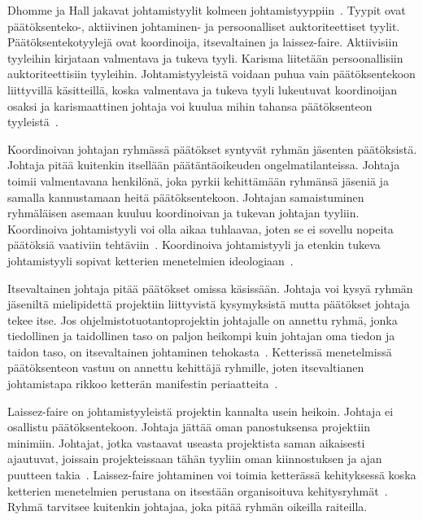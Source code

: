 \documentclass[finnish]{tktltiki2}
\theoremstyle{definition}
\theoremstyle{remark}
\begin{document}
 Dhomme ja Hall jakavat johtamistyylit kolmeen johtamistyyppiin~\cite{Dhomne:2012:ITL:2382887.2382899}. Tyypit ovat päätöksenteko-, aktiivinen johtaminen- ja persoonalliset auktoriteettiset tyylit. Päätöksentekotyylejä ovat koordinoija, itsevaltainen ja laissez-faire. Aktiivisiin tyyleihin kirjataan valmentava ja tukeva tyyli. Karisma liitetään persoonallisiin auktoriteettisiin tyyleihin. Johtamistyyleistä voidaan puhua vain päätöksentekoon liittyvillä käsitteillä, koska valmentava ja tukeva tyyli lukeutuvat koordinoijan osaksi ja karismaattinen johtaja voi kuulua mihin tahansa päätöksenteon tyyleistä~\cite{Dhomne:2012:ITL:2382887.2382899}.

Koordinoivan johtajan ryhmässä päätökset syntyvät ryhmän jäsenten päätöksistä. Johtaja pitää kuitenkin itsellään päätäntäoikeuden ongelmatilanteissa. Johtaja toimii valmentavana henkilönä, joka pyrkii kehittämään ryhmänsä jäseniä ja samalla kannustamaan heitä päätöksentekoon. Johtajan samaistuminen ryhmäläisen asemaan kuuluu koordinoivan ja tukevan johtajan tyyliin. Koordinoiva johtamistyyli voi olla aikaa tuhlaavaa, joten se ei sovellu nopeita päätöksiä vaativiin tehtäviin~\cite{Dhomne:2012:ITL:2382887.2382899}. Koordinoiva johtamistyyli ja etenkin tukeva johtamistyyli sopivat ketterien menetelmien ideologiaan~\cite{fowler2001agile}.

Itsevaltainen johtaja pitää päätökset omissa käsissään. Johtaja voi kysyä ryhmän jäseniltä mielipidettä projektiin liittyvistä kysymyksistä mutta päätökset johtaja tekee itse. Jos ohjelmistotuotantoprojektin johtajalle on annettu ryhmä, jonka tiedollinen ja taidollinen taso on paljon heikompi kuin johtajan oma tiedon ja taidon taso, on itsevaltainen johtaminen tehokasta~\cite{Dhomne:2012:ITL:2382887.2382899}. Ketterissä menetelmissä päätöksenteon vastuu on annettu kehittäjä ryhmille, joten itsevaltianen johtamistapa rikkoo ketterän manifestin periaatteita~\cite{fowler2001agile}.

Laissez-faire on johtamistyyleistä projektin kannalta usein heikoin. Johtaja ei osallistu päätöksentekoon. Johtaja jättää oman panostuksensa projektiin minimiin. Johtajat, jotka vastaavat useasta projektista saman aikaisesti ajautuvat, joissain projekteissaan tähän tyyliin oman kiinnostuksen ja ajan puutteen takia~\cite{Dhomne:2012:ITL:2382887.2382899}. Laissez-faire johtaminen voi toimia ketterässä kehityksessä koska ketterien menetelmien perustana on itsestään organisoituva kehitysryhmät~\cite{fowler2001agile}. Ryhmä tarvitsee kuitenkin johtajaa, joka pitää ryhmän oikeilla raiteilla.
\end{document}

